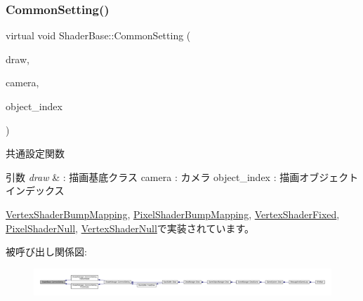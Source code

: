 \subsubsection{\texorpdfstring{Common\+Setting()}{CommonSetting()}}
{\footnotesize\ttfamily virtual void Shader\+Base\+::\+Common\+Setting (\begin{DoxyParamCaption}\item[{\mbox{\hyperlink{class_draw_base}{Draw\+Base}} $\ast$}]{draw,  }\item[{\mbox{\hyperlink{class_camera}{Camera}} $\ast$}]{camera,  }\item[{unsigned}]{object\+\_\+index }\end{DoxyParamCaption})\hspace{0.3cm}{\ttfamily [pure virtual]}}



共通設定関数 


\begin{DoxyParams}{引数}
{\em draw} & \+: 描画基底クラス camera \+: カメラ object\+\_\+index \+: 描画オブジェクトインデックス \\
\hline
\end{DoxyParams}


\mbox{\hyperlink{class_vertex_shader_bump_mapping_a7979584d035fff86d386c99617a8dd2c}{Vertex\+Shader\+Bump\+Mapping}}, \mbox{\hyperlink{class_pixel_shader_bump_mapping_af62a2b40930533a3bae17319f876705d}{Pixel\+Shader\+Bump\+Mapping}}, \mbox{\hyperlink{class_vertex_shader_fixed_a82bf2829b6fd0df26faedcbf650ba08d}{Vertex\+Shader\+Fixed}}, \mbox{\hyperlink{class_pixel_shader_null_a99c712ab174da29ba26a893820b64799}{Pixel\+Shader\+Null}}, \mbox{\hyperlink{class_vertex_shader_null_a95f1a66045fb39c42cf0566f1990b6a1}{Vertex\+Shader\+Null}}で実装されています。

被呼び出し関係図\+:
\nopagebreak
\begin{figure}[H]
\begin{center}
\leavevmode
\includegraphics[width=350pt]{class_shader_base_aef6fa922223d71fbec81464ebbfaf687_icgraph}
\end{center}
\end{figure}
\mbox{\label{class_shader_base_a85a5c17b56b6ffa29f7784ab42696d7c}} 
